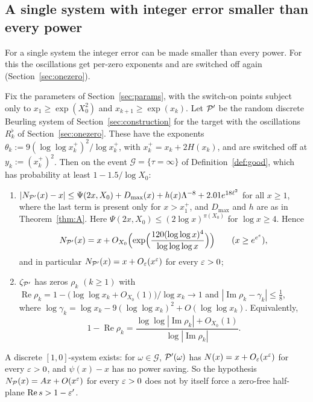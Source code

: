 \subsection{A single system with integer error smaller than every power}
For a single system the integer error can be made smaller than every power. For this the oscillations get per-zero exponents
and are switched off again (Section~\ref{sec:onezero}).

\begin{theorem}[Theorem A$'$]\label{thm:Aprime}
Fix the parameters of Section~\ref{sec:params}, with the switch-on points subject only to $x_1\ge\exp(X_0^2)$ and $x_{k+1}\ge\exp(x_k)$. Let
$\mathcal{P}'$ be the random discrete Beurling system of Section~\ref{sec:construction} for the target with the oscillations $R_k^\flat$ of
Section~\ref{sec:onezero}. These have the exponents $\theta_k:=9(\log\log x_k^+)^2/\log x_k^+$, with $x_k^+=x_k+2H(x_k)$, and are switched
off at $y_k:=(x_k^+)^2$. Then on the event $\mathcal G=\{\tau=\infty\}$ of Definition~\ref{def:good}, which has probability at least
$1-1.5/\log X_0$:
\begin{enumerate}[label=(\roman*)]
\item $|N_{\mathcal{P}'}(x)-x|\le\Psi(2x,X_0)+D_{\max}(x)+h(x)\Lambda^{-8}+2.01e^{18\ell^2}$ for all $x\ge1$, where the last term is present only
for $x>x_1^+$, and $D_{\max}$ and $h$ are as in Theorem~\ref{thm:A}. Here $\Psi(2x,X_0)\le(2\log x)^{\pi(X_0)}$ for $\log x\ge4$. Hence
\[
  N_{\mathcal{P}'}(x)=x+O_{X_0}\Bigl(\exp\Bigl(\frac{120(\log\log x)^4}{\log\log\log x}\Bigr)\Bigr)\qquad(x\ge e^{e^e}),
\]
and in particular $N_{\mathcal{P}'}(x)=x+O_\varepsilon(x^\varepsilon)$ for every $\varepsilon>0$;
\item $\zeta_{\mathcal{P}'}$ has zeros $\rho_k$ $(k\ge1)$ with $\operatorname{Re}\rho_k=1-\bigl(\log\log x_k+O_{X_0}(1)\bigr)/\log x_k\to1$ and
$|\operatorname{Im}\rho_k-\gamma_k|\le\frac18$, where $\log\gamma_k=\log x_k-9(\log\log x_k)^2+O(\log\log x_k)$. Equivalently,
\[
  1-\operatorname{Re}\rho_k=\frac{\log\log|\operatorname{Im}\rho_k|+O_{X_0}(1)}{\log|\operatorname{Im}\rho_k|}.
\]
\end{enumerate}
\end{theorem}

\begin{corollary}\label{cor:onezero}
A discrete $[1,0]$-system exists: for $\omega\in\mathcal G$, $\mathcal{P}'(\omega)$ has $N(x)=x+O_\varepsilon(x^\varepsilon)$ for every $\varepsilon>0$, and
$\psi(x)-x$ has no power saving. So the hypothesis $N_{\mathcal{P}}(x)=Ax+O(x^{\varepsilon})$ for every $\varepsilon>0$ does not by itself force a
zero-free half-plane $\operatorname{Re}s>1-\varepsilon'$.
\end{corollary}

